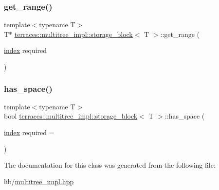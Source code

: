 \subsubsection{\texorpdfstring{get\+\_\+range()}{get\_range()}}
{\footnotesize\ttfamily template$<$typename T$>$ \\
T$\ast$ \hyperlink{classterraces_1_1multitree__impl_1_1storage__block}{terraces\+::multitree\+\_\+impl\+::storage\+\_\+block}$<$ T $>$\+::get\+\_\+range (\begin{DoxyParamCaption}\item[{\hyperlink{namespaceterraces_adbc33ccb543d1634e96d0eb02e472c77}{index}}]{required }\end{DoxyParamCaption})\hspace{0.3cm}{\ttfamily [inline]}}

\mbox{\label{classterraces_1_1multitree__impl_1_1storage__block_ad96d4d6043d66550c587ba7e2d6101c1}} 
\subsubsection{\texorpdfstring{has\+\_\+space()}{has\_space()}}
{\footnotesize\ttfamily template$<$typename T$>$ \\
bool \hyperlink{classterraces_1_1multitree__impl_1_1storage__block}{terraces\+::multitree\+\_\+impl\+::storage\+\_\+block}$<$ T $>$\+::has\+\_\+space (\begin{DoxyParamCaption}\item[{\hyperlink{namespaceterraces_adbc33ccb543d1634e96d0eb02e472c77}{index}}]{required = {} }\end{DoxyParamCaption})\hspace{0.3cm}{\ttfamily [inline]}}



The documentation for this class was generated from the following file\+:\begin{DoxyCompactItemize}
\item 
lib/\hyperlink{multitree__impl_8hpp}{multitree\+\_\+impl.\+hpp}\end{DoxyCompactItemize}
